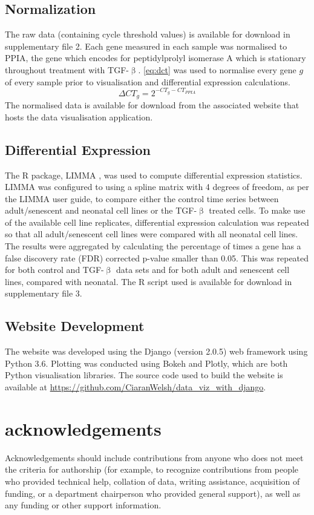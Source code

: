 \documentclass[alpha-refs]{wiley-article}
\newcommand{\tgf}{TGF-$\upbeta$}
\begin{document}
\subsection{Normalization}
The raw data (containing cycle threshold values) is available for download in supplementary file 2. Each gene measured in each sample was normalised to PPIA, the gene which encodes for peptidylprolyl isomerase A which is stationary throughout treatment with \tgf{}. \cref{eq:dct} was used to normalise every gene $g$ of every sample prior to visualisation and differential expression calculations. 
\begin{equation}
\Delta CT_g = 2^{-CT_g - CT_{PPIA}} 
\label{eq:dct}
\end{equation}
The normalised data is available for download from the associated website that hosts the data visualisation application.

\subsection{Differential Expression}
The R package, LIMMA \citep{Smyth2004,Smyth2005, Ritchie2015}, was used to compute differential expression statistics. LIMMA was configured to using a spline matrix with 4 degrees of freedom, as per the LIMMA user guide, to compare either the control time series between adult/senescent and neonatal cell lines or the \tgf{} treated cells. To make use of the available cell line replicates, differential expression calculation was repeated so that all adult/senescent cell lines were compared with all neonatal cell lines. The results were aggregated by calculating the percentage of times a gene has a false discovery rate (FDR) corrected p-value smaller than 0.05. This was repeated for both control and \tgf{} data sets and for both adult and senescent cell lines, compared with neonatal. The R script used is available for download in supplementary file 3.  

\subsection{Website Development}
The website was developed using the Django (version 2.0.5) web framework using Python 3.6. Plotting was conducted using Bokeh and Plotly, which are both Python visualisation libraries. The source code used to build the website is available at \url{https://github.com/CiaranWelsh/data_viz_with_django}. 

\section*{acknowledgements}
Acknowledgements should include contributions from anyone who does not meet the criteria for authorship (for example, to recognize contributions from people who provided technical help, collation of data, writing assistance, acquisition of funding, or a department chairperson who provided general support), as well as any funding or other support information.
\end{document}
